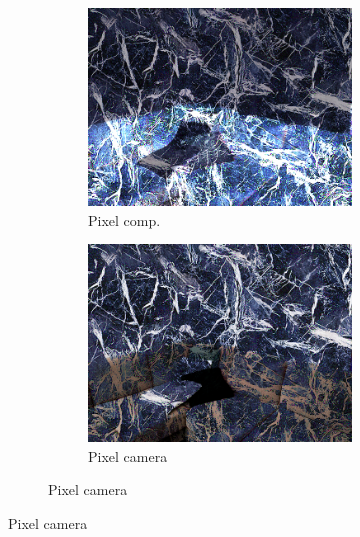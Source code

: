 \begin{figure}[]
\begin{subfigure}{\textwidth}
\begin{subfigure}{0.24\textwidth}
            \includegraphics[width=\textwidth]{images/04-experiment02/sofa/marble/pixel_im.jpg}
            \caption*{Pixel comp.}
        \end{subfigure}
        \hfill
        \begin{subfigure}{0.24\textwidth}
            \centering
            \includegraphics[width=\textwidth]{images/04-experiment02/sofa/marble/pixel_proj.jpg}
            \caption*{Pixel camera}
        \end{subfigure}
    \end{subfigure}


\end{figure}

